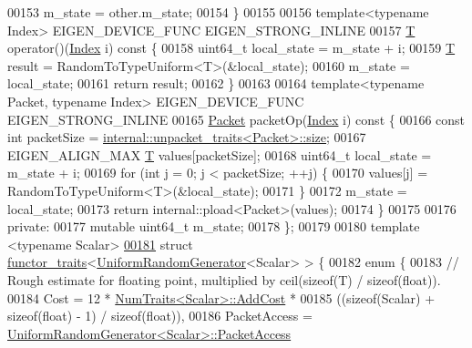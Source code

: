 \begin{DoxyCode}
00153     m\_state = other.m\_state;
00154   \}
00155 
00156   \textcolor{keyword}{template}<\textcolor{keyword}{typename} Index> EIGEN\_DEVICE\_FUNC EIGEN\_STRONG\_INLINE
00157   \hyperlink{group___sparse_core___module}{T} operator()(\hyperlink{namespace_eigen_a62e77e0933482dafde8fe197d9a2cfde}{Index} i)\textcolor{keyword}{ const }\{
00158     uint64\_t local\_state = m\_state + i;
00159     \hyperlink{group___sparse_core___module}{T} result = RandomToTypeUniform<T>(&local\_state);
00160     m\_state = local\_state;
00161     \textcolor{keywordflow}{return} result;
00162   \}
00163 
00164   \textcolor{keyword}{template}<\textcolor{keyword}{typename} Packet, \textcolor{keyword}{typename} Index> EIGEN\_DEVICE\_FUNC EIGEN\_STRONG\_INLINE
00165   \hyperlink{union_eigen_1_1internal_1_1_packet}{Packet} packetOp(\hyperlink{namespace_eigen_a62e77e0933482dafde8fe197d9a2cfde}{Index} i)\textcolor{keyword}{ const }\{
00166     \textcolor{keyword}{const} \textcolor{keywordtype}{int} packetSize = \hyperlink{struct_eigen_1_1internal_1_1unpacket__traits}{internal::unpacket\_traits<Packet>::size};
00167     EIGEN\_ALIGN\_MAX \hyperlink{group___sparse_core___module}{T} values[packetSize];
00168     uint64\_t local\_state = m\_state + i;
00169     \textcolor{keywordflow}{for} (\textcolor{keywordtype}{int} j = 0; j < packetSize; ++j) \{
00170       values[j] = RandomToTypeUniform<T>(&local\_state);
00171     \}
00172     m\_state = local\_state;
00173     \textcolor{keywordflow}{return} internal::pload<Packet>(values);
00174   \}
00175 
00176  \textcolor{keyword}{private}:
00177   \textcolor{keyword}{mutable} uint64\_t m\_state;
00178 \};
00179 
00180 \textcolor{keyword}{template} <\textcolor{keyword}{typename} Scalar>
\hyperlink{struct_eigen_1_1internal_1_1functor__traits_3_01_uniform_random_generator_3_01_scalar_01_4_01_4}{00181} \textcolor{keyword}{struct }\hyperlink{struct_eigen_1_1internal_1_1functor__traits}{functor\_traits}<\hyperlink{class_eigen_1_1internal_1_1_uniform_random_generator}{UniformRandomGenerator}<Scalar> > \{
00182   \textcolor{keyword}{enum} \{
00183     \textcolor{comment}{// Rough estimate for floating point, multiplied by ceil(sizeof(T) / sizeof(float)).}
00184     Cost = 12 * \hyperlink{group___core___module_struct_eigen_1_1_num_traits}{NumTraits<Scalar>::AddCost} *
00185            ((\textcolor{keyword}{sizeof}(Scalar) + \textcolor{keyword}{sizeof}(\textcolor{keywordtype}{float}) - 1) / \textcolor{keyword}{sizeof}(\textcolor{keywordtype}{float})),
00186     PacketAccess = \hyperlink{class_eigen_1_1internal_1_1_uniform_random_generator}{UniformRandomGenerator<Scalar>::PacketAccess}

\end{DoxyCode}
